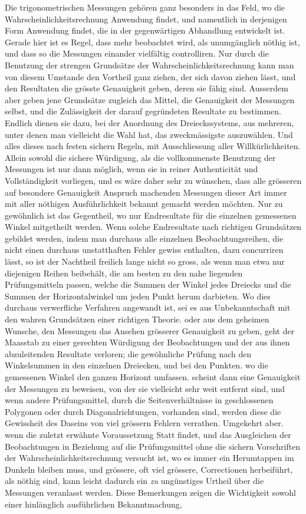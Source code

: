 Die trigonometrischen Messungen gehören ganz besonders in das Feld, wo die Wahrscheinlichkeitsrechnung Anwendung findet, und namentlich in derjenigen Form Anwendung findet, die in der gegenwärtigen Abhandlung entwickelt ist. Gerade hier ist es Regel, dass mehr beobachtet wird, als unumgänglich nöthig ist, und dass so die Messungen einander vielfältig controlliren. Nur durch die Benutzung der strengen Grundsätze der Wahrscheinlichkeitsrechnung kann man von diesem Umstande den Vortheil ganz ziehen, der sich davon ziehen lässt, und den Resultaten die grösste Genauigkeit geben, deren sie fähig sind. Ausserdem aber geben jene Grundsätze zugleich das Mittel, die Genauigkeit der Messungen selbst, und die Zulässigkeit der darauf gegründeten Resultate zu bestimmen. Endlich dienen sie dazu, bei der Anordnung des Dreieckssystems, aus mehreren, unter denen man vielleicht die Wahl hat, das zweckmässigste auszuwählen. Und alles dieses nach festen sichern Regeln, mit Ausschliessung aller Willkürlichkeiten. Allein sowohl die sichere Würdigung, als die vollkommenste Benutzung der Messungen ist nur dann möglich, wenn sie in reiner Authenticität und Vollständigkeit vorliegen, und es wäre daher sehr zu wünschen, dass alle grösseren auf besondere Genauigkeit Anspruch machenden Messungen dieser Art immer mit aller nöthigen Ausführlichkeit bekannt gemacht werden möchten. Nur zu gewöhnlich ist das Gegentheil, wo nur Endresultate für die einzelnen gemessenen Winkel mitgetheilt werden. Wenn solche Endresultate nach richtigen Grundsätzen gebildet werden, indem man durchaus alle einzelnen Beobachtungsreihen, die nicht einen durchaus unstatthaften Fehler gewiss enthalten, dazu concurriren lässt, so ist der Nachtheil freilich lange nicht so gross, als wenn man etwa nur diejenigen Reihen beibehält, die am besten zu den nahe liegenden Prüfungsmitteln passen, welche die Summen der Winkel jedes Dreiecks und die Summen der Horizontalwinkel um jeden Punkt herum darbieten. Wo dies durchaus verwerfliche Verfahren angewandt ist, sei es aus Unbekanntschaft mit den wahren Grundsätzen einer richtigen Theorie. oder aus dem geheimen Wunsche, den Messungen das Ansehen grösserer Genauigkeit zu geben, geht der Maasstab zu einer gerechten Würdigung der Beobachtungen und der aus ihnen abzuleitenden Resultate verloren; die gewöhnliche Prüfung nach den Winkelsummen in den einzelnen Dreiecken, und bei den Punkten. wo die gemessenen Winkel den ganzen Horizont umfassen. scheint dann eine Genauigkeit der Messungen zu beweisen, von der sie vielleicht sehr weit entfernt sind, und wenn andere Prüfungsmittel, durch die Seitenverhältnisse in geschlossenen Polygonen oder durch Diagonalrichtungen, vorhanden sind, werden diese die Gewissheit des Daseins von viel grössern Fehlern verrathen. Umgekehrt aber. wenn die zuletzt erwähnte Voraussetzung Statt findet, und das Ausgleichen der Beobachtungen in Beziehung auf die Prüfungsmittel ohne die sichern Vorschriften der Wahrscheinlichkeitsrechnung versucht ist, wo es immer ein Herumtappen im Dunkeln bleiben muss, und grössere, oft viel grössere, Correctionen herbeiführt, als nöthig sind, kann leicht dadurch ein \textit{zu} ungünstiges Urtheil über die Messungen veranlasst werden. Diese Bemerkungen zeigen die Wichtigkeit sowohl einer hinlänglich ausführlichen Bekanntmachung, 